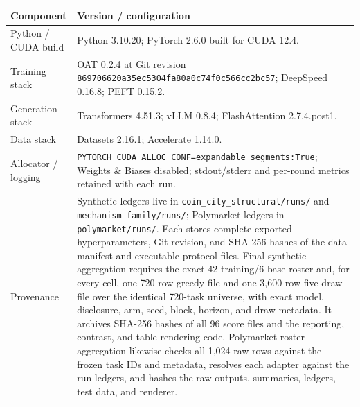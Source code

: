 \begin{center}
\begin{minipage}{\linewidth}
\centering
{}
\label{tab:exp3-runtime}
\scriptsize
\setlength{\tabcolsep}{3pt}
\begin{tabular}{p{.29\linewidth}p{.66\linewidth}}
\toprule
\textbf{Component} & \textbf{Version / configuration} \\
\midrule
Python / CUDA build & Python 3.10.20; PyTorch 2.6.0 built for CUDA 12.4. \\
Training stack & OAT 0.2.4 at Git revision
\texttt{869706620a35ec5304fa80a0\allowbreak{}c74f0c566cc2bc57}; DeepSpeed 0.16.8; PEFT 0.15.2. \\
Generation stack & Transformers 4.51.3; vLLM 0.8.4; FlashAttention 2.7.4.post1. \\
Data stack & Datasets 2.16.1; Accelerate 1.14.0. \\
Allocator / logging & \texttt{PYTORCH\_CUDA\_ALLOC\_CONF=expandable\_segments:True};
Weights \& Biases disabled; stdout/stderr and per-round metrics retained with each
run. \\
Provenance & Synthetic ledgers live in
\texttt{coin\_city\_structural/runs/} and \texttt{mechanism\_family/runs/};
Polymarket ledgers in \texttt{polymarket/runs/}.
Each stores complete exported hyperparameters, Git revision, and SHA-256
hashes of the data manifest and executable protocol files.  Final synthetic
aggregation requires the exact 42-training/6-base roster and, for every cell,
one 720-row greedy file and one 3,600-row five-draw file over the identical
720-task universe, with exact model, disclosure, arm, seed, block, horizon, and
draw metadata. It archives SHA-256 hashes of all 96 score files and the reporting,
contrast, and table-rendering code.  Polymarket roster aggregation likewise checks
all 1,024 raw rows against the frozen task IDs and metadata, resolves each adapter
against the run ledgers, and hashes the raw outputs,
summaries, ledgers, test data, and renderer. \\
\bottomrule
\end{tabular}
\end{minipage}
\end{center}
